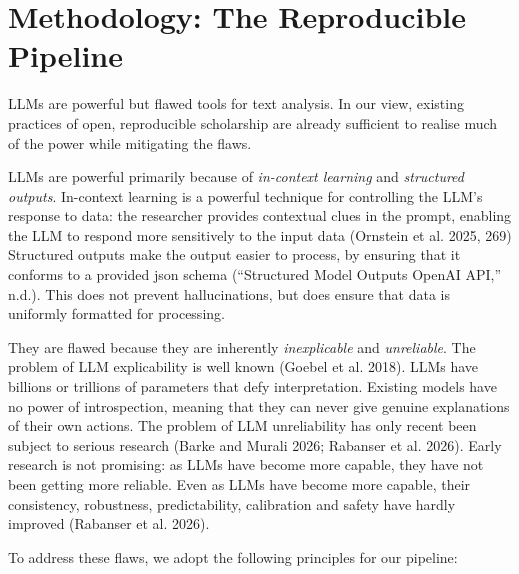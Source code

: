 \documentclass[
  letterpaper,
  DIV=11,
  numbers=noendperiod]{scrartcl}
\begin{document}
\section{Methodology: The Reproducible Pipeline}\label{sec-methodology}

LLMs are powerful but flawed tools for text analysis. In our view,
existing practices of open, reproducible scholarship are already
sufficient to realise much of the power while mitigating the flaws.

LLMs are powerful primarily because of \emph{in-context learning} and
\emph{structured outputs}. In-context learning is a powerful technique
for controlling the LLM's response to data: the researcher provides
contextual clues in the prompt, enabling the LLM to respond more
sensitively to the input data (Ornstein et al. 2025, 269) Structured
outputs make the output easier to process, by ensuring that it conforms
to a provided json schema ({``Structured Model Outputs {\textbar}
{OpenAI} {API},''} n.d.). This does not prevent hallucinations, but does
ensure that data is uniformly formatted for processing.

They are flawed because they are inherently \emph{inexplicable} and
\emph{unreliable}. The problem of LLM explicability is well known
(Goebel et al. 2018). LLMs have billions or trillions of parameters that
defy interpretation. Existing models have no power of introspection,
meaning that they can never give genuine explanations of their own
actions. The problem of LLM unreliability has only recent been subject
to serious research (Barke and Murali 2026; Rabanser et al. 2026). Early
research is not promising: as LLMs have become more capable, they have
not been getting more reliable. Even as LLMs have become more capable,
their consistency, robustness, predictability, calibration and safety
have hardly improved (Rabanser et al. 2026).

To address these flaws, we adopt the following principles for our
pipeline:
\end{document}
